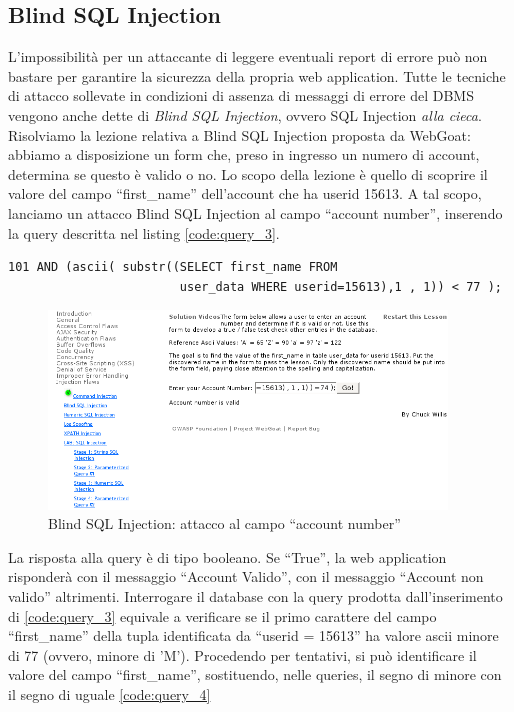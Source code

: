 \documentclass[a4paper,openright,italian]{article}
\begin{document}
\subsection{Blind SQL Injection}
L'impossibilit\`a per un attaccante di leggere eventuali report di errore pu\`o non bastare per garantire la sicurezza della propria web application. Tutte le tecniche di attacco sollevate in condizioni di assenza di messaggi di errore del DBMS vengono anche dette di {\it Blind SQL Injection}, ovvero SQL Injection {\it alla cieca}.
Risolviamo la lezione relativa a Blind SQL Injection proposta da WebGoat: abbiamo a disposizione un form che, preso in ingresso un numero di account, determina se questo \`e valido o no. Lo scopo della lezione \`e quello di scoprire il valore del campo ``first\_name'' dell'account che ha userid 15613. A tal scopo, lanciamo un attacco Blind SQL Injection al campo ``account number'', inserendo la query descritta nel listing \ref{code:query_3}.
\begin{lstlisting}[caption={Query di interrogazione}, label={code:query_3},frame=trBL]
101 AND (ascii( substr((SELECT first_name FROM 
                        user_data WHERE userid=15613),1 , 1)) < 77 );
\end{lstlisting}
\begin{figure}[h]
\centering
\includegraphics[width=300pt]{images/sql_injection_blind_1.png}
\caption{Blind SQL Injection: attacco al campo ``account number''}
\end{figure}
La risposta alla query \`e di tipo booleano. Se ``True'', la web application risponder\`a con il messaggio ``Account Valido'', con il messaggio ``Account non valido'' altrimenti. Interrogare il database con la query prodotta dall'inserimento di \ref{code:query_3} equivale a verificare se il primo carattere del campo ``first\_name'' della tupla identificata da ``userid = 15613'' ha valore ascii minore di 77 (ovvero, minore di 'M').
Procedendo per tentativi, si pu\`o identificare il valore del campo ``first\_name'', sostituendo, nelle queries, il segno di minore con il segno di uguale \ref{code:query_4}
\end{document}
